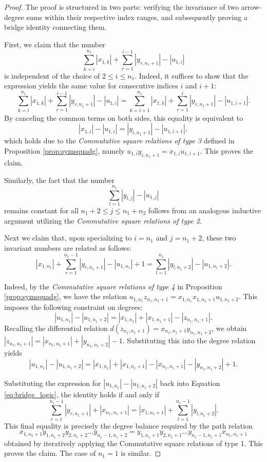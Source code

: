 \documentclass[a4paper, reqno, 11pt]{amsart}
\theoremstyle{definition}
\begin{document}
\begin{proof}
	The proof is structured in two parts: verifying the invariance of two arrow-degree sums within their respective index ranges, and subsequently proving a bridge identity connecting them.
	
	First, we claim that the number
	\[
	\sum\limits_{k=i}^{n_1} |x_{1,k}| + \sum\limits_{r=1}^{i-1} |y_{r,n_1+1}| - |u_{1,i}|
	\]
	is independent of the choice of $2 \leq i \leq n_1$. Indeed, it suffices to show that the expression yields the same value for consecutive indices $i$ and $i+1$:
	\[
	\sum\limits_{k=i}^{n_1} |x_{1,k}| + \sum\limits_{r=1}^{i-1} |y_{r,n_1+1}| -|u_{1,i}| = \sum\limits_{k=i+1}^{n_1} |x_{1,k}| + \sum\limits_{r=1}^{i} |y_{r,n_1+1}| -|u_{1,i+1}|.
	\]
	By canceling the common terms on both sides, this equality is equivalent to
	\[
	|x_{1,i}| - |u_{1,i}| = |y_{i,n_1+1}| - |u_{1,i+1}|,
	\]
	which holds due to the \emph{Commutative square relations of type 3} defined in Proposition \ref{prop:symsquadg}, namely  $u_{1,i}y_{i,n_1+1} = x_{1,i}u_{1,i+1}$. This proves the claim. 
	
	Similarly, the fact that the number
	\[
	\sum\limits_{l=1}^{n_1} |y_{l,j}| - |u_{1,j}|
	\]
	remains constant for all $n_1+2 \leq j \leq n_1+n_2$ follows from an analogous inductive argument utilizing the \emph{Commutative square relations of type 2}.
	
	Next we claim that, upon specializing to $i=n_1$ and $j=n_1+2$, these two invariant numbers are related as follows:
	\begin{equation} \label{eq:bridge_logic}
		|x_{1,n_1}| + \sum\limits_{r=1}^{n_1-1} |y_{r,n_1+1}| - |u_{1,n_1}| + 1 = \sum\limits_{l=1}^{n_1} |y_{l,n_1+2}| - |u_{1,n_1+2}|.
	\end{equation}
	
	Indeed, by the \emph{Commutative square relations of type 4} in Proposition \ref{prop:symsquadg}, we have the relation $u_{1,n_1}z_{n_1,n_1+1} = x_{1,n_1}x_{1,n_1+1}u_{1,n_1+2}$. This imposes the following constraint on degrees:
	\[
	|u_{1,n_1}| - |u_{1,n_1+2}| = |x_{1,n_1}| + |x_{1,n_1+1}| - |z_{n_1,n_1+1}|.
	\]
	Recalling the differential relation $d(z_{n_1,n_1+1}) = x_{n_1,n_1+1}y_{n_1,n_1+2}$, we obtain $|z_{n_1,n_1+1}| = |x_{n_1,n_1+1}| + |y_{n_1,n_1+2}| - 1$. Substituting this into the degree relation yields
	\[
	|u_{1,n_1}| - |u_{1,n_1+2}| = |x_{1,n_1}| + |x_{1,n_1+1}| - |x_{n_1,n_1+1}| - |y_{n_1,n_1+2}| + 1.
	\]
	
	Substituting the expression for $|u_{1,n_1}| - |u_{1,n_1+2}|$ back into Equation \eqref{eq:bridge_logic}, the identity holds if and only if
	\[
	\sum\limits_{r=1}^{n_1-1} |y_{r,n_1+1}| + |x_{n_1,n_1+1}| = |x_{1,n_1+1}| + \sum\limits_{l=1}^{n_1-1} |y_{l,n_1+2}|.
	\]
	This final equality is precisely the degree balance required by the path relation 
	\[ 
	x_{1,n_1+1}y_{1,n_1+2}y_{2,n_1+2}\dots y_{n_1-1,n_1+2} = y_{1,n_1+1}y_{2,n_1+1}\dots y_{n_1-1,n_1+1}x_{n_1,n_1+1} 
	\]
	obtained by iteratively applying the Commutative square relations of type 1. This proves the claim. The case of $n_1=1$ is similar. 
\end{proof}
\end{document}

